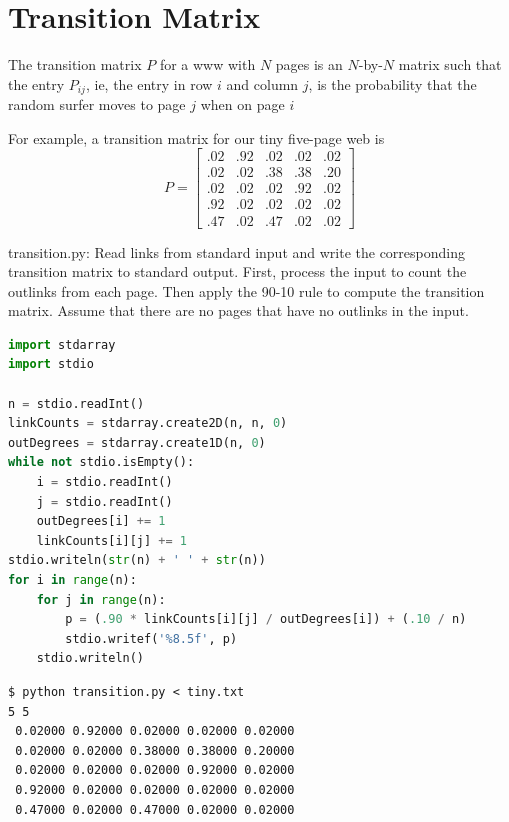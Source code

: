 \documentclass[8pt,a4paper,compress]{beamer}
\begin{document}
\section{Transition Matrix}
\begin{frame}[fragile]
\pause

The transition matrix $P$ for a www with $N$ pages is an $N$-by-$N$ matrix such that the entry $P_{ij}$, ie, the entry in row $i$ and column $j$, is the probability that the random surfer moves to page $j$ when on page $i$

\pause
\bigskip

For example, a transition matrix for our tiny five-page web is
\[
P = \begin{bmatrix}
.02 & .92 & .02 & .02 & .02 \\
.02 & .02 & .38 & .38 & .20 \\
.02 & .02 & .02 & .92 & .02 \\
.92 & .02 & .02 & .02 & .02 \\
.47 & .02 & .47 & .02 & .02
\end{bmatrix}
\]
\end{frame}
\begin{frame}[fragile]
\pause

\begin{framed}
\tiny transition.py: Read links from standard input and write the corresponding transition matrix to standard output. First, process the input to count the outlinks from each page. Then apply the 90-10 rule to compute the transition matrix. Assume that there are no pages that have no outlinks in the input.
\end{framed}

\begin{lstlisting}[language=Python]
import stdarray
import stdio

n = stdio.readInt()
linkCounts = stdarray.create2D(n, n, 0)
outDegrees = stdarray.create1D(n, 0)
while not stdio.isEmpty():
    i = stdio.readInt()
    j = stdio.readInt()
    outDegrees[i] += 1
    linkCounts[i][j] += 1
stdio.writeln(str(n) + ' ' + str(n))
for i in range(n):
    for j in range(n):
        p = (.90 * linkCounts[i][j] / outDegrees[i]) + (.10 / n)
        stdio.writef('%8.5f', p)
    stdio.writeln()
\end{lstlisting}

\pause

\begin{lstlisting}[language={}]
$ python transition.py < tiny.txt
5 5
 0.02000 0.92000 0.02000 0.02000 0.02000
 0.02000 0.02000 0.38000 0.38000 0.20000
 0.02000 0.02000 0.02000 0.92000 0.02000
 0.92000 0.02000 0.02000 0.02000 0.02000
 0.47000 0.02000 0.47000 0.02000 0.02000
\end{lstlisting}
\end{frame}
\end{document}
